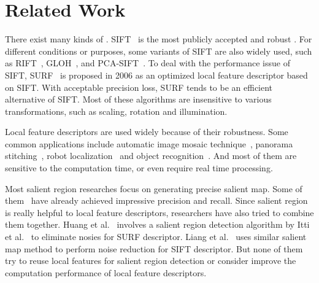 \section{Related Work}

There exist many kinds of {\lfea}. SIFT~\cite{lowe1999object}\cite{lowe2004distinctive} is the most publicly accepted and robust {\lfea}. For different conditions or purposes, some variants of SIFT are also widely used, such as RIFT~\cite{lazebnik2005sparse}, GLOH~\cite{mikolajczyk2005performance}, and PCA-SIFT~\cite{ke2004pca}. To deal with the performance issue of SIFT, SURF~\cite{bay2006surf} is proposed in 2006 as an optimized local feature descriptor based on SIFT. With acceptable precision loss, SURF tends to be an efficient alternative of SIFT. Most of these algorithms are insensitive to various transformations, such as scaling, rotation and illumination.

Local feature descriptors are used widely because of their robustness. Some common applications include automatic image mosaic technique~\cite{yang2008image,salgian2007using}, panorama stitching~\cite{brown2003recognising,tang2008modified}, robot localization~\cite{se2001vision} and object recognition~\cite{heo2008illumination}. And most of them are sensitive to the computation time, or even require real time processing.

Most salient region researches focus on generating precise salient map. Some of them~\cite{cheng2011global,achanta2009frequency} have already achieved impressive precision and recall. Since salient region is really helpful to local feature descriptors, researchers have also tried to combine them together. Huang et al.~\cite{huang2009image} involves a salient region detection algorithm by Itti et al.~\cite{itti1998model} to eliminate nosies for SURF descriptor. Liang et al.~\cite{liang2010salient} uses similar salient map method to perform noise reduction for SIFT descriptor. But none of them try to reuse local features for salient region detection or consider improve the computation performance of local feature descriptors.